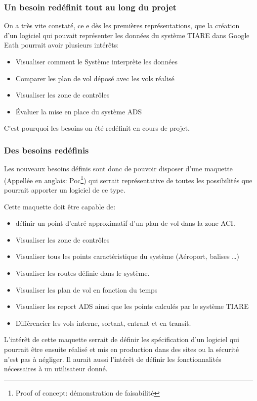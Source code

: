         \subsubsection{Un besoin redéfinit tout au long du projet}
On a très vite constaté, ce e dès les premières représentations,  que la création d'un logiciel qui pouvait représenter les données du système TIARE dans Google Eath pourrait avoir plusieurs intérêts:
\begin{itemize}
\item Visualiser comment le Système interprète les données
\item Comparer les plan de vol déposé avec les vols réalisé
\item Visualiser les zone de contrôles
\item Évaluer la mise en place du système ADS
\end{itemize}
C'est pourquoi les besoins on été redéfinit en cours de projet.

        \subsubsection{Des besoins redéfinis}
Les nouveaux besoins définis sont donc de pouvoir disposer d'une maquette (Appellée en anglais: Poc\footnote{Proof of concept: démonstration de faisabilité}) qui serrait représentative de toutes les possibilités que pourrait apporter un logiciel de ce type.

Cette maquette doit être capable de:
\begin{itemize}
\item définir un point d'entré approximatif d'un plan de vol dans la zone ACI.
\item Visualiser les zone de contrôles
\item Visualiser tous les points caractéristique du système (Aéroport, balises …)
\item Visualiser les routes définie dans le système.
\item Visualiser les plan de vol en fonction du temps
\item Visualiser les report ADS ainsi que les points calculés par le système TIARE
\item Différencier les vols interne, sortant, entrant et en transit.
\end{itemize}

L’intérêt de cette maquette serrait de définir les spécification d'un logiciel qui pourrait être ensuite réalisé et mis en production dans des sites ou la sécurité n'est pas à négliger. Il aurait aussi l’intérêt de définir les fonctionnalités nécessaires à un utilisateur donné.

